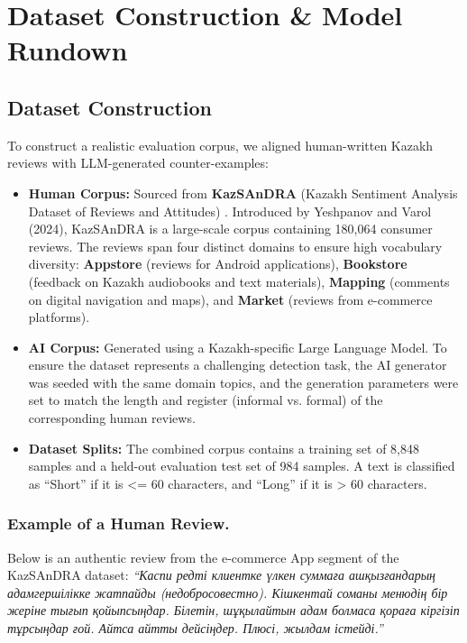 \documentclass[runningheads]{llncs}
\begin{document}
\section{Dataset Construction \& Model Rundown}
\subsection{Dataset Construction}
To construct a realistic evaluation corpus, we aligned human-written Kazakh reviews with LLM-generated counter-examples:
\begin{itemize}
\item \textbf{Human Corpus:} Sourced from \textbf{KazSAnDRA} (Kazakh Sentiment Analysis Dataset of Reviews and Attitudes) \cite{1}. Introduced by Yeshpanov and Varol (2024), KazSAnDRA is a large-scale corpus containing 180,064 consumer reviews. The reviews span four distinct domains to ensure high vocabulary diversity: \textbf{Appstore} (reviews for Android applications), \textbf{Bookstore} (feedback on Kazakh audiobooks and text materials), \textbf{Mapping} (comments on digital navigation and maps), and \textbf{Market} (reviews from e-commerce platforms).
\item \textbf{AI Corpus:} Generated using a Kazakh-specific Large Language Model. To ensure the dataset represents a challenging detection task, the AI generator was seeded with the same domain topics, and the generation parameters were set to match the length and register (informal vs. formal) of the corresponding human reviews.
\item \textbf{Dataset Splits:} The combined corpus contains a training set of 8,848 samples and a held-out evaluation test set of 984 samples. A text is classified as ``Short'' if it is <= 60 characters, and ``Long'' if it is > 60 characters.
\end{itemize}

\subsubsection{Example of a Human Review.}
Below is an authentic review from the e-commerce App segment of the KazSAnDRA dataset:
\textit{``Каспи редті клиентке үлкен суммаға ашқызғандарың адамгершілікке жатпайды (недобросовестно). Кішкентай соманы менюдің бір жеріне тығып қойыпсыңдар. Білетін, шұқылайтын адам болмаса қораға кіргізіп тұрсыңдар ғой. Айтса айтты дейсіңдер. Плюсі, жылдам істейді.''}
\end{document}
